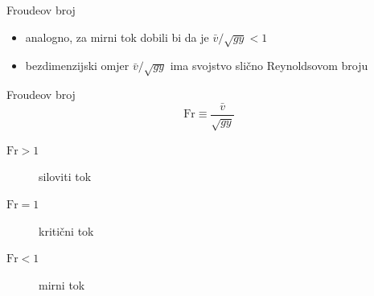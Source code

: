 \documentclass[croatian]{beamer}
\begin{document}
\begin{frame}{Froudeov broj}

\begin{itemize}
\item analogno, za mirni tok dobili bi da je $\bar{v}/\sqrt{gy}<1$
\item bezdimenzijski omjer $\bar{v}/\sqrt{gy}$ ima svojstvo slično Reynoldsovom
broju 
\end{itemize}
\begin{alertblock}{Froudeov broj}
\[
\mathrm{Fr}\equiv\frac{\bar{v}}{\sqrt{gy}}
\]

\begin{description}
\item [{$\mathrm{Fr}>1$}] siloviti tok
\item [{$\mathrm{Fr}=1$}] kritični tok
\item [{$\mathrm{Fr}<1$}] mirni tok\bigskip{}
\end{description}
\end{alertblock}
\end{frame}
\end{document}
